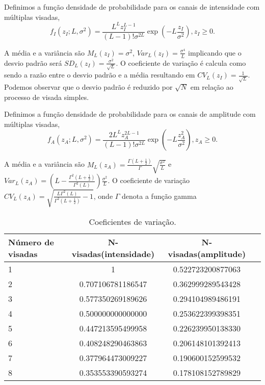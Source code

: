 Definimos a função densidade de probabilidade para os canais de intensidade com múltiplas visadas,    
\begin{equation}\label{pdf_inten_multilook}
f_I(z_I;L,\sigma^2)=\frac{L^L z_I^{L-1}}{(L-1)!\sigma^{2L}}\exp\left(-L\frac{z_I}{\sigma^2}\right), z_I\geq 0.
\end{equation}

A média e a variância são $M_L(z_I)=\sigma^2$, $Var_L(z_I)=\frac{\sigma^4}{L}$ implicando que o desvio padrão será $SD_L(z_I)=\frac{\sigma^2}{\sqrt{L}}$. O coeficiente de variação é calcula como sendo a razão entre o desvio padrão e a média resultando em $CV_L(z_I)=\frac{1}{\sqrt{L}}$. Podemos observar que o desvio padrão é reduzido por $\sqrt{N}$ em relação ao processo de visada simples.

Definimos a função densidade de probabilidade para os canais de amplitude com múltiplas visadas,    
\begin{equation}\label{pdf_inten_multilook}
f_A(z_A;L,\sigma^2)=\frac{2L^L z_A^{2L-1}}{(L-1)!\sigma^{2L}}\exp\left(-L\frac{z_A^2}{\sigma^2}\right), z_A\geq 0.
\end{equation}

A média e a variância são $M_L(z_A)=\frac{\Gamma\left(L+\frac{1}{2}\right)}{\Gamma}\sqrt{\frac{\sigma^2}{L}}$ e $Var_L(z_A)=\left(L-\frac{\Gamma^2\left(L+\frac{1}{2}\right)}{\Gamma^2(L)}\right)\frac{\sigma^2}{L}$. O coeficiente de variação $CV_L(z_A)=\sqrt{\frac{L\Gamma^2(L)}{\Gamma^2\left(L+\frac{1}{2}\right)}-1}$, onde $\Gamma$ denota a função gamma

\begin{table}[hbt]
	\centering
	\caption{Coeficientes de variação.}\label{cv_multilook}
\begin{tabular}{@{}lccc@{}} \toprule
	Número de visadas & N-visadas(intensidade)   & N- visadas(amplitude) \\ \midrule
	1 & 1                  &   0.522723200877063\\ 
	2 &  0.707106781186547 &  0.362999289543428\\
	3 &  0.577350269189626 &  0.294104989486191\\
	4 & 0.500000000000000  & 0.253622399398351 \\
	5 & 0.447213595499958  & 0.226239950138330 \\
	6 &  0.408248290463863 &  0.206148101392413\\
	7 &  0.377964473009227 &  0.190600152599532\\ 
	8 & 0.353553390593274  &  0.178108152789829\\ \bottomrule
\end{tabular}
\end{table}

